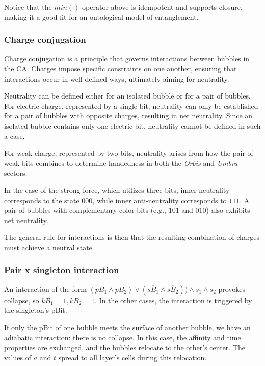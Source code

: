 \documentclass[12pt]{article}
\begin{document}
Notice that the $min()$ operator above is idempotent and supports closure, making it a good fit for an ontological model of entanglement.

\subsubsection{Charge conjugation}

Charge conjugation is a principle that governs interactions between bubbles in the CA. Charges impose specific constraints on one another, ensuring that interactions occur in well-defined ways, ultimately aiming for neutrality.

Neutrality can be defined either for an isolated bubble or for a pair of bubbles. For electric charge, represented by a single bit, neutrality can only be established for a pair of bubbles with opposite charges, resulting in net neutrality. Since an isolated bubble contains only one electric bit, neutrality cannot be defined in such a case.

For weak charge, represented by two bits, neutrality arises from how the pair of weak bits combines to determine handedness in both the \textit{Orbis} and \textit{Umbra} sectors.

In the case of the strong force, which utilizes three bits, inner neutrality corresponds to the state \(000\), while inner anti-neutrality corresponds to \(111\). A pair of bubbles with complementary color bits (e.g., \(101\) and \(010\)) also exhibits net neutrality.

The general rule for interactions is then that the resulting combination of charges must achieve a neutral state.

\subsubsection{Pair x singleton interaction}
An interaction of the form $(pB_1\wedge pB_2)\vee (\overline{sB_1}\wedge\overline{sB_2}))\wedge s_1\wedge s_2$ provokes collapse, so $kB_1=1,kB_2=1$. In the other cases, the interaction is triggered by the singleton's pBit.

If only the pBit of one bubble meets the surface of another bubble, we have an adiabatic interaction: there is no collapse. In this case, the affinity and time properties are exchanged, and the bubbles relocate to the other's center. The values of $a$ and $t$ spread to all layer's cells during this relocation.
\end{document}
